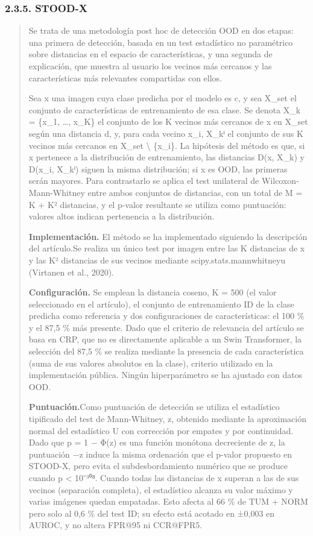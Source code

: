 \subsubsection{2.3.5. STOOD-X}\label{stood-x}

\begin{quote}
Se trata de una metodología post hoc de detección OOD en dos etapas: una
primera de detección, basada en un test estadístico no paramétrico sobre
distancias en el espacio de características, y una segunda de
explicación, que muestra al usuario los vecinos más cercanos y las
características más relevantes compartidas con ellos.

Sea x una imagen cuya clase predicha por el modelo es c, y sea X\_set el
conjunto de características de entrenamiento de esa clase. Se denota
X\_k = \{x\_1, \ldots, x\_K\} el conjunto de los K vecinos más cercanos
de x en X\_set según una distancia d, y, para cada vecino x\_i, X\_kⁱ el
conjunto de sus K vecinos más cercanos en X\_set \textbackslash{}
\{x\_i\}. La hipótesis del método es que, si x pertenece a la
distribución de entrenamiento, las distancias D(x, X\_k) y D(x\_i,
X\_kⁱ) siguen la misma distribución; si x es OOD, las primeras serán
mayores. Para contrastarlo se aplica el test unilateral de
Wilcoxon-Mann-Whitney entre ambos conjuntos de distancias, con un total
de M = K + K² distancias, y el p-valor resultante se utiliza como
puntuación: valores altos indican pertenencia a la distribución.

\textbf{Implementación.} El método se ha implementado siguiendo la
descripción del artículo.Se realiza un único test por imagen entre las K
distancias de x y las K² distancias de sus vecinos mediante
scipy.stats.mannwhitneyu (Virtanen et al., 2020).

\textbf{Configuración.} Se emplean la distancia coseno, K = 500 (el
valor seleccionado en el artículo), el conjunto de entrenamiento ID de
la clase predicha como referencia y dos configuraciones de
características: el 100 \% y el 87,5 \% más presente. Dado que el
criterio de relevancia del artículo se basa en CRP, que no es
directamente aplicable a un Swin Transformer, la selección del 87,5 \%
se realiza mediante la presencia de cada característica (suma de sus
valores absolutos en la clase), criterio utilizado en la implementación
pública. Ningún hiperparámetro se ha ajustado con datos OOD.

\textbf{Puntuación.}Como puntuación de detección se utiliza el
estadístico tipificado del test de Mann-Whitney, z, obtenido mediante la
aproximación normal del estadístico U con corrección por empates y por
continuidad. Dado que p = 1 − Φ(z) es una función monótona decreciente
de z, la puntuación −z induce la misma ordenación que el p-valor
propuesto en STOOD-X, pero evita el subdesbordamiento numérico que se
produce cuando p \textless{} 10⁻³⁰⁸. Cuando todas las distancias de x
superan a las de sus vecinos (separación completa), el estadístico
alcanza su valor máximo y varias imágenes quedan empatadas. Esto afecta
al 66 \% de TUM + NORM pero solo al 0,6 \% del test ID; su efecto está
acotado en ±0,003 en AUROC, y no altera FPR@95 ni CCR@FPR5.


\end{quote}
